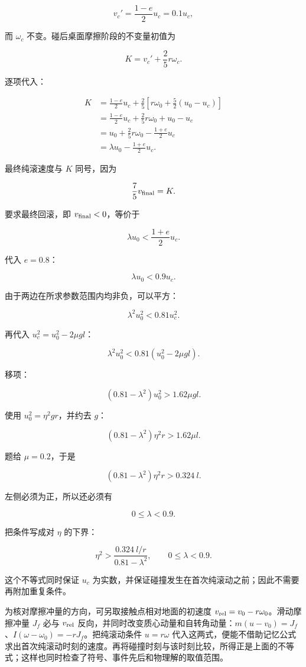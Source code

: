 \documentclass[12pt,a4paper,UTF8]{ctexart}
\begin{document}
\[v_c'=\frac{1-e}{2}u_c=0.1u_c,\]

而 \(\omega_c\) 不变。碰后桌面摩擦阶段的不变量初值为

\[K=v_c'+\frac25r\omega_c.\]

逐项代入：

\[\begin{aligned}
K
&=\frac{1-e}{2}u_c+\frac25\left[r\omega_0+\frac52(u_0-u_c)\right]\\
&=\frac{1-e}{2}u_c+\frac25r\omega_0+u_0-u_c\\
&=u_0+\frac25r\omega_0-\frac{1+e}{2}u_c\\
&=\lambda u_0-\frac{1+e}{2}u_c.
\end{aligned}\]

最终纯滚速度与 \(K\) 同号，因为

\[\frac75v_{\rm final}=K.\]

要求最终回滚，即 \(v_{\rm final}<0\)，等价于

\[\lambda u_0<\frac{1+e}{2}u_c.\]

代入 \(e=0.8\)：

\[\lambda u_0<0.9u_c.\]

由于两边在所求参数范围内均非负，可以平方：

\[\lambda^2u_0^2<0.81u_c^2.\]

再代入 \(u_c^2=u_0^2-2\mu gl\)：

\[\lambda^2u_0^2<0.81(u_0^2-2\mu gl).\]

移项：

\[(0.81-\lambda^2)u_0^2>1.62\mu gl.\]

使用 \(u_0^2=\eta^2gr\)，并约去 \(g\)：

\[(0.81-\lambda^2)\eta^2r>1.62\mu l.\]

题给 \(\mu=0.2\)，于是

\[\boxed{(0.81-\lambda^2)\eta^2r>0.324\ l}.\]

左侧必须为正，所以还必须有

\[\boxed{0\le\lambda<0.9}.\]

把条件写成对 \(\eta\) 的下界：

\[\boxed{\eta^2>\frac{0.324\ l/r}{0.81-\lambda^2},\qquad 0\le\lambda<0.9}.\]

这个不等式同时保证 \(u_c\)
为实数，并保证碰撞发生在首次纯滚动之前；因此不需要再附加重复条件。

为核对摩擦冲量的方向，可另取接触点相对地面的初速度
\(v_{\rm rel}=v_0-r\omega_0\)。滑动摩擦冲量 \(J_f\) 必与 \(v_{\rm rel}\)
反向，并同时改变质心动量和自转角动量：\(m(u-v_0)=J_f\)、\(I(\omega-\omega_0)=-rJ_f\)。把纯滚动条件
\(u=r\omega\)
代入这两式，便能不借助记忆公式求出首次纯滚动时刻的速度。再将碰撞时刻与该时刻比较，所得正是上面的不等式；这样也同时检查了符号、事件先后和物理解的取值范围。
\end{document}
